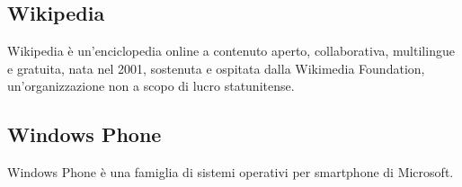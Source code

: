 \subsection{Wikipedia}
Wikipedia è un'enciclopedia online a contenuto aperto, collaborativa, multilingue e gratuita, nata nel 2001, sostenuta e ospitata dalla Wikimedia Foundation, un'organizzazione non a scopo di lucro statunitense.

\subsection{Windows Phone}
Windows Phone è una famiglia di sistemi operativi per smartphone di Microsoft.

